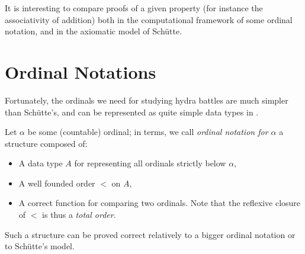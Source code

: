 



It is interesting to compare proofs of a given property (for instance the associativity of addition) both in the computational framework of some ordinal notation, and in the axiomatic model of Schütte.

\section{Ordinal Notations}


Fortunately, the ordinals we need for  studying hydra battles are much simpler than Schütte's, and can be represented as quite simple data types in \gallina. 

Let $\alpha$ be some (countable) ordinal; 
in \coq{} terms, we call \emph{ordinal notation for $\alpha$} a structure composed 
of:
\begin{itemize}
\item A data type $A$ for representing all ordinals strictly below $\alpha$,
\item A well founded order $<$ on $A$, 
\item A correct function for comparing two ordinals. Note  that the reflexive closure of $<$ is thus a \emph{total order}.
\end{itemize}


Such a structure can be proved correct relatively to a bigger ordinal notation or
to Schütte's model.





